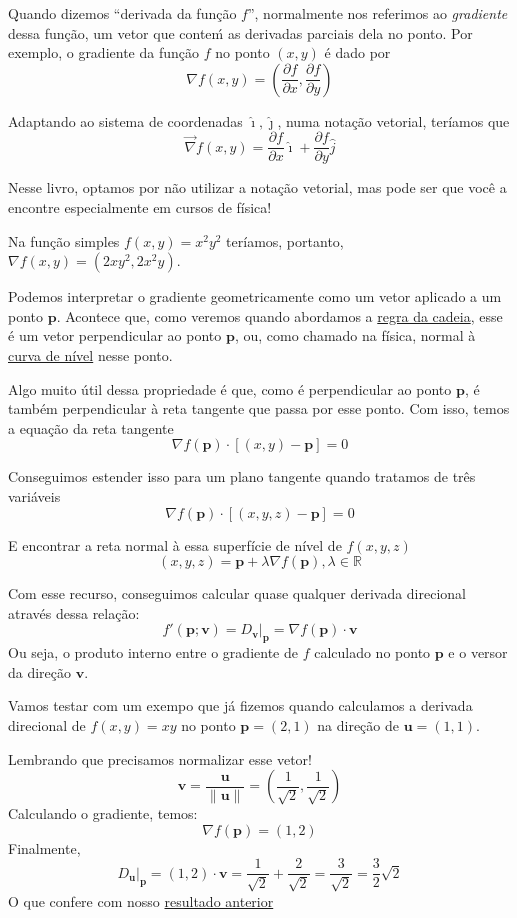 \documentclass[
  letterpaper,
  DIV=11,
  numbers=noendperiod]{scrreprt}
\begin{document}
Quando dizemos ``derivada da função \(f\)'', normalmente nos referimos
ao \emph{gradiente} dessa função, um vetor que conteḿ as derivadas
parciais dela no ponto. Por exemplo, o gradiente da função \(f\) no
ponto \((x,y)\) é dado por \[
\nabla f(x,y) = \left(\frac{\partial f}{\partial x}, \frac{\partial f}{\partial y}\right)
\]

Adaptando ao sistema de coordenadas \(\hat{\imath}, \hat{\jmath}\), numa
notação vetorial, teríamos que \[
\vec{\nabla} f(x,y) = \frac{\partial f}{\partial x} \hat{\imath} +
\frac{\partial f}{\partial y} \hat{j}
\]

Nesse livro, optamos por não utilizar a notação vetorial, mas pode ser
que você a encontre especialmente em cursos de física!

Na função simples \(f(x,y) = x^2y^2\) teríamos, portanto,
\(\nabla f(x,y) = (2xy^2, 2x^2y)\).

Podemos interpretar o gradiente geometricamente como um vetor aplicado a
um ponto \(\pmb{p}\). Acontece que, como veremos quando abordamos a
\href{cadeia-tfi.qmd}{regra da cadeia}, esse é um vetor perpendicular ao
ponto \(\pmb{p}\), ou, como chamado na física, normal à
\href{curvas.qmd}{curva de nível} nesse ponto.

Algo muito útil dessa propriedade é que, como é perpendicular ao ponto
\(\pmb{p}\), é também perpendicular à reta tangente que passa por esse
ponto. Com isso, temos a equação da reta tangente \[
\nabla f (\pmb{p}) \cdot [(x,y) - \pmb{p}] = 0
\]

Conseguimos estender isso para um plano tangente quando tratamos de três
variáveis \[
\nabla f (\pmb{p}) \cdot [(x,y,z) - \pmb{p}] = 0
\]

E encontrar a reta normal à essa superfície de nível de \(f(x,y,z)\) \[
(x,y,z) = \pmb{p} + \lambda \nabla f (\pmb{p}), \lambda \in \mathbb{R}
\]

Com esse recurso, conseguimos calcular quase qualquer derivada
direcional através dessa relação: \[
f'(\pmb{p}; \pmb{v}) = D_{\pmb{v}} \rvert_{\pmb{p}} =  \nabla f (\pmb{p}) \cdot \pmb{v}
\] Ou seja, o produto interno entre o gradiente de \(f\) calculado no
ponto \(\pmb{p}\) e o versor da direção \(\pmb{v}\).

Vamos testar com um exempo que já fizemos quando calculamos a derivada
direcional de \(f(x,y) = xy\) no ponto \(\pmb{p} = (2,1)\) na direção de
\(\pmb{u} = (1,1)\).

Lembrando que precisamos normalizar esse vetor! \[
\pmb{v} = \frac{\pmb{u}}{\lVert \pmb{u} \rVert} = \left(\frac{1}{\sqrt{2}}, \frac{1}{\sqrt{2}}\right)
\] Calculando o gradiente, temos: \[
\nabla f(\pmb{p}) = (1,2)
\] Finalmente, \[
D_{\pmb{u}}\rvert_{\pmb{p}} = (1,2) \cdot \pmb{v} = \frac{1}{\sqrt{2}}+\frac{2}{\sqrt{2}} = \frac{3}{\sqrt{2}} = \frac{3}{2} \sqrt{2}
\] O que confere com nosso
\hyperref[exercuxedcio---derivada-direcional]{resultado anterior}
\end{document}
